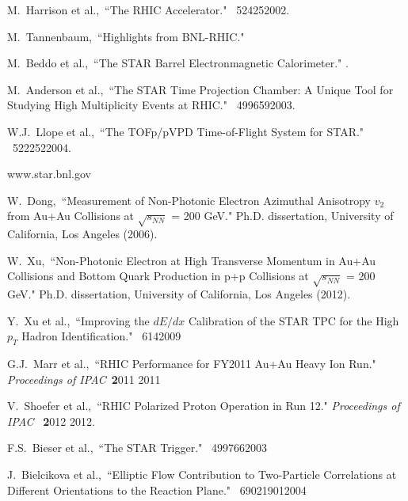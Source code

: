 \begin{thebibliography}{1000}
M.~Harrison et al.,~``The RHIC Accelerator." \Journal{\ARNPS} {~52}{425}{2002}.

M.~Tannenbaum,~``Highlights from BNL-RHIC." 

M.~Beddo et al.,~``The STAR Barrel Electronmagnetic Calorimeter." .

M.~Anderson et al.,~``The STAR Time Projection Chamber: A Unique Tool for Studying High Multiplicity Events at RHIC." \Journal{\NIM } {~499}{659}{2003}.

W.J.~Llope et al.,~``The TOFp/pVPD Time-of-Flight System for STAR." \Journal{\NIM} {~522}{252}{2004}.

www.star.bnl.gov

W.~Dong,~``Measurement of Non-Photonic Electron Azimuthal Anisotropy $v_2$ from Au+Au Collisions at $\sqrt{s_{NN}}$ = 200 GeV." Ph.D. dissertation, University of California, Los Angeles (2006).

W.~Xu,~``Non-Photonic Electron at High Transverse Momentum in Au+Au Collisions and Bottom Quark Production in p+p Collisions at $\sqrt{s_{NN}}$ = 200 GeV." Ph.D. dissertation, University of California, Los Angeles (2012).

Y.~Xu et al.,~``Improving the $dE/dx$ Calibration of the STAR TPC for the High $p_T$ Hadron Identification." \Journal{\NIM} {~614}{}{2009}

G.J.~Marr et al.,~``RHIC Performance for FY2011 Au+Au Heavy Ion Run." \textit {Proceedings of IPAC}~{\textbf 2011} {2011}

V.~Shoefer et al.,~``RHIC Polarized Proton Operation in Run 12." \textit {Proceedings of IPAC}
~{\textbf 2012} {2012}.

F.S.~Bieser et al.,~``The STAR Trigger." \Journal{\NIM} {~499}{766}{2003}


J.~Bielcikova et al.,~``Elliptic Flow Contribution to Two-Particle Correlations at Different Orientations to the Reaction Plane." \Journal{\PRC} {~69}{021901}{2004}


\end{thebibliography}
